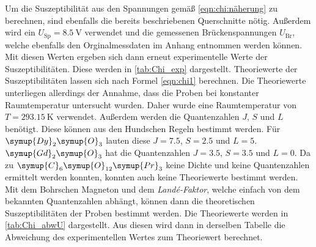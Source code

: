 Um die Suszeptibilität aus den Spannungen gemäß \autoref{eqn:chi:näherung} zu berechnen, sind ebenfalls die bereits beschriebenen Querschnitte nötig. Außerdem wird ein 
$U_{\text{Sp}} = \qty{8.5}{\volt}$ verwendet und die gemessenen Brückenspannungen $U_{\text{Br}}$, welche ebenfalls den Orginalmessdaten im Anhang entnommen werden können.
Mit diesen Werten ergeben sich dann erneut experimentelle Werte der Suszeptibilitäten. Diese werden in \autoref{tab:Chi_exp} dargestellt.
Theoriewerte der Suszeptibilitäten lassen sich nach Formel \eqref{eqn:chi1} berechnen. Die Theoriewerte unterliegen allerdings der Annahme, dass die Proben bei konstanter 
Raumtemperatur untersucht wurden. Daher wurde eine Raumtemperatur von $T = \qty{293.15}{\kelvin}$ verwendet. Außerdem werden die Quantenzahlen $J$, $S$ und $L$ benötigt. Diese
können aus den Hundschen Regeln bestimmt werden. Für $\symup{Dy}_2\symup{O}_3$ lauten diese $J = 7.5$, $S = 2.5$ und $L = 5$. $\symup{Gd}_2\symup{O}_3$ hat die Quantenzahlen
$J = 3.5$, $S = 3.5$ und $L = 0$. Da zu $\symup{C}_6\symup{O}_{12}\symup{Pr}_3$ keine Dichte und keine Quantenzahlen ermittelt werden konnten, 
konnten auch keine Theoriewerte bestimmt werden.
Mit dem Bohrschen Magneton und dem \textit{Landé-Faktor}, welche einfach von dem bekannten Quantenzahlen abhängt, können dann die theoretischen Suszeptibilitäten der Proben
bestimmt werden. Die Theoriewerte werden in \autoref{tab:Chi_abwU} dargestellt. Aus diesen wird dann in derselben Tabelle die Abweichung des experimentellen
Wertes zum Theoriewert berechnet. 

